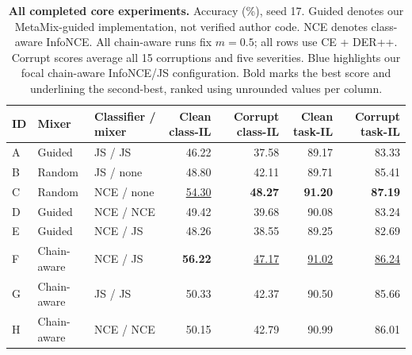 \begin{table}[t]
\centering\small
\setlength{\tabcolsep}{7pt}
\begin{tabular}{lllrrrr}
\toprule
ID & Mixer & Classifier / mixer & Clean class-IL & Corrupt class-IL & Clean task-IL & Corrupt task-IL \\
\midrule
A & Guided & JS / JS & 46.22 & 37.58 & 89.17 & 83.33 \\
B & Random & JS / none & 48.80 & 42.11 & 89.71 & 85.41 \\
C & Random & NCE / none & \underline{54.30} & \textbf{48.27} & \textbf{91.20} & \textbf{87.19} \\
D & Guided & NCE / NCE & 49.42 & 39.68 & 90.08 & 83.24 \\
E & Guided & NCE / JS & 48.26 & 38.55 & 89.25 & 82.69 \\
\rowcolor{ourrow} F & Chain-aware & NCE / JS & \textbf{56.22} & \underline{47.17} & \underline{91.02} & \underline{86.24} \\
G & Chain-aware & JS / JS & 50.33 & 42.37 & 90.50 & 85.66 \\
H & Chain-aware & NCE / NCE & 50.15 & 42.79 & 90.99 & 86.01 \\
\bottomrule
\end{tabular}
\caption{\textbf{All completed core experiments.} Accuracy (\%), seed 17.
Guided denotes our MetaMix-guided implementation, not verified author code.
NCE denotes class-aware InfoNCE. All chain-aware runs fix $m=0.5$; all rows use
CE + DER++. Corrupt scores average all 15 corruptions and five severities.
Blue highlights our focal chain-aware InfoNCE/JS configuration.
Bold marks the best score and underlining the second-best, ranked using unrounded values per column.}
\label{tab:main}
\end{table}
